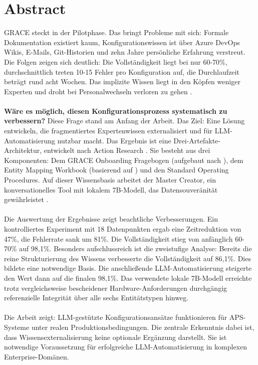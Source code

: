\section{Abstract}
\label{sec:Abstract}

GRACE steckt in der Pilotphase. Das bringt Probleme mit sich: Formale Dokumentation existiert kaum, Konfigurationswissen ist über Azure DevOps Wikis, E-Mails, Git-Historien und zehn Jahre persönliche Erfahrung verstreut. Die Folgen zeigen sich deutlich: Die Vollständigkeit liegt bei nur 60-70\%, durchschnittlich treten 10-15 Fehler pro Konfiguration auf, die Durchlaufzeit beträgt rund acht Wochen. Das implizite Wissen liegt in den Köpfen weniger Experten und droht bei Personalwechseln verloren zu gehen \citep{polanyi:tacit_dimension1966, nonaka:knowledge_creating_company1995}.
\\\\
\textbf{Wäre es möglich, diesen Konfigurationsprozess systematisch zu verbessern?} Diese Frage stand am Anfang der Arbeit. Das Ziel: Eine Lösung entwickeln, die fragmentiertes Expertenwissen externalisiert und für LLM-Automatisierung nutzbar macht. Das Ergebnis ist eine Drei-Artefakte-Architektur, entwickelt nach Action Research \citep{lewin:action_research1946}. Sie besteht aus drei Komponenten: Dem GRACE Onboarding Fragebogen (aufgebaut nach \cite{devellis:scale_development2017}), dem Entity Mapping Workbook (basierend auf \cite{chen:erm1976}) und den Standard Operating Procedures. Auf dieser Wissensbasis arbeitet der Master Creator, ein konversationelles Tool mit lokalem 7B-Modell, das Datensouveränität gewährleistet \citep{hummel:data_sovereignty2021, gupta:multilingual2025}.
\\\\
Die Auswertung der Ergebnisse zeigt beachtliche Verbesserungen. Ein kontrolliertes Experiment mit 18 Datenpunkten ergab eine Zeitreduktion von 47\%, die Fehlerrate sank um 81\%. Die Vollständigkeit stieg von anfänglich 60-70\% auf 98,1\%. Besonders aufschlussreich ist die zweistufige Analyse: Bereits die reine Strukturierung des Wissens verbesserte die Vollständigkeit auf 86,1\%. Dies bildete eine notwendige Basis. Die anschließende LLM-Automatisierung steigerte den Wert dann auf die finalen 98,1\%. Das verwendete lokale 7B-Modell erreichte trotz vergleichsweise bescheidener Hardware-Anforderungen durchgängig referenzielle Integrität über alle sechs Entitätstypen hinweg.
\\\\
Die Arbeit zeigt: LLM-gestützte Konfigurationsansätze funktionieren für APS-Systeme unter realen Produktionsbedingungen. Die zentrale Erkenntnis dabei ist, dass Wissensexternalisierung keine optionale Ergänzung darstellt. Sie ist notwendige Voraussetzung für erfolgreiche LLM-Automatisierung in komplexen Enterprise-Domänen.


